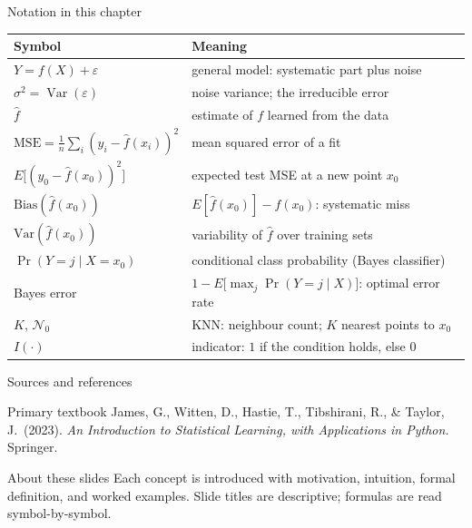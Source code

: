 \documentclass[aspectratio=169,11pt]{beamer}
\begin{document}
\begin{frame}{Notation in this chapter}
  \footnotesize
  \begin{center}
  \begin{tabular}{@{}ll@{}}
    \toprule
    \textbf{Symbol} & \textbf{Meaning} \\
    \midrule
    $Y=f(X)+\varepsilon$ & general model: systematic part plus noise \\
    $\sigma^2=\operatorname{Var}(\varepsilon)$ & noise variance; the irreducible error \\
    $\hat f$ & estimate of $f$ learned from the data \\
    $\mathrm{MSE}=\frac1n\sum_i (y_i-\hat f(x_i))^2$ & mean squared error of a fit \\
    $E\big[(y_0-\hat f(x_0))^2\big]$ & expected test MSE at a new point $x_0$ \\
    $\mathrm{Bias}(\hat f(x_0))$ & $E[\hat f(x_0)]-f(x_0)$: systematic miss \\
    $\mathrm{Var}(\hat f(x_0))$ & variability of $\hat f$ over training sets \\
    $\Pr(Y=j\mid X=x_0)$ & conditional class probability (Bayes classifier) \\
    Bayes error & $1-E\big[\max_j \Pr(Y=j\mid X)\big]$: optimal error rate \\
    $K$, $\mathcal N_0$ & KNN: neighbour count; $K$ nearest points to $x_0$ \\
    $I(\cdot)$ & indicator: $1$ if the condition holds, else $0$ \\
    \bottomrule
  \end{tabular}
  \end{center}
\end{frame}

\begin{frame}{Sources and references}
  \begin{block}{Primary textbook}
    James, G., Witten, D., Hastie, T., Tibshirani, R., \& Taylor, J.\ (2023).
    \emph{An Introduction to Statistical Learning, with Applications in
    Python.} Springer.
  \end{block}
  \begin{block}{About these slides}
    Each concept is introduced with motivation, intuition, formal
    definition, and worked examples. Slide titles are descriptive;
    formulas are read symbol-by-symbol.
  \end{block}
\end{frame}
\end{document}
